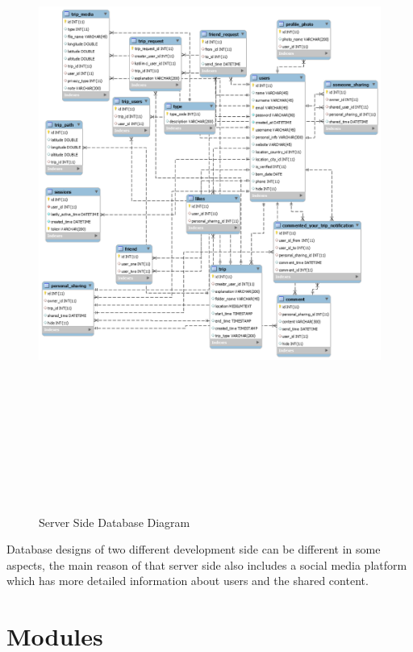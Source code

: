 \begin{figure}[!htbp]
\centering
\includegraphics[width=40em, height=58em]{projectChapters/images/databaseDesign.png}
\caption{Server Side Database Diagram}
\label{fig:serverDatabase}
\end{figure}

Database designs of two different development side can be different in some aspects, the main reason of that server side also includes a social media platform which has more detailed information about users and the shared content. 

\newpage

\section{Modules}

